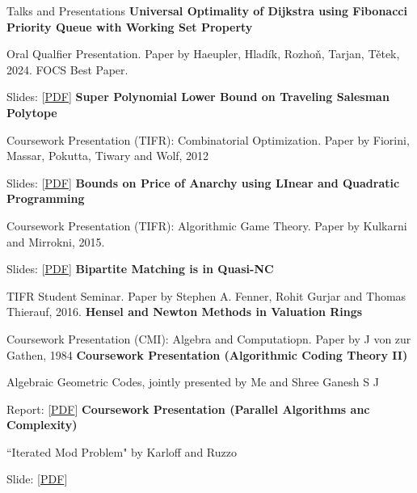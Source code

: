\begin{rubric}{Talks and Presentations}
\entry*[2026]%
    \textbf{Universal Optimality of Dijkstra using Fibonacci Priority Queue with Working Set Property}

    Oral Qualfier Presentation. Paper by Haeupler, Hladík, Rozhoň, Tarjan, Tětek, 2024. FOCS Best Paper.

    Slides: [\href{https://sohamch08.github.io/assets/dijkstra-optimal.pdf}{PDF}]
\entry*[2025]%
    \textbf{Super Polynomial Lower Bound on Traveling Salesman Polytope}

    Coursework Presentation (TIFR): Combinatorial Optimization. Paper by Fiorini, Massar, Pokutta, Tiwary and Wolf, 2012

    Slides: [\href{https://sohamch08.github.io/assets/copt-presentation.pdf}{PDF}]
 \entry*[2025]%
    \textbf{Bounds on Price of Anarchy using LInear and Quadratic Programming}

    Coursework Presentation (TIFR): Algorithmic Game Theory. Paper by Kulkarni and Mirrokni, 2015.

    Slides: [\href{https://sohamch08.github.io/assets/agt-presentation.pdf}{PDF}]
\entry*[2025]%
	\textbf{Bipartite Matching is in \textsf{Quasi-NC}}

    TIFR Student Seminar. Paper by Stephen A. Fenner, Rohit Gurjar and Thomas Thierauf, 2016.
\entry*[2024]%
	\textbf{Hensel and Newton Methods in Valuation Rings}

    Coursework Presentation (CMI): Algebra and Computatiopn. Paper by J von zur Gathen, 1984
\entry*[2023]%
	\textbf{Coursework Presentation (Algorithmic Coding Theory II)}

    Algebraic Geometric Codes, jointly presented by Me and Shree Ganesh S J

    Report: [\href{https://sohamch08.github.io/assets/act-report.pdf}{PDF}]
\entry*[2023]%
	\textbf{Coursework Presentation (Parallel Algorithms anc Complexity)}

    ``Iterated Mod Problem" by Karloff and Ruzzo

    Slide: [\href{https://sohamch08.github.io/assets/parallel-presentation-iterated-mod.pdf}{PDF}]
\end{rubric}